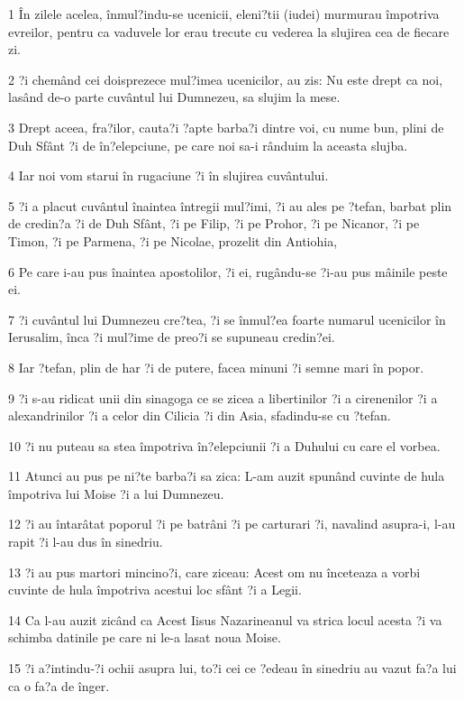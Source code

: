 \par 1 În zilele acelea, înmul?indu-se ucenicii, eleni?tii (iudei) murmurau împotriva evreilor, pentru ca vaduvele lor erau trecute cu vederea la slujirea cea de fiecare zi.
\par 2 ?i chemând cei doisprezece mul?imea ucenicilor, au zis: Nu este drept ca noi, lasând de-o parte cuvântul lui Dumnezeu, sa slujim la mese.
\par 3 Drept aceea, fra?ilor, cauta?i ?apte barba?i dintre voi, cu nume bun, plini de Duh Sfânt ?i de în?elepciune, pe care noi sa-i rânduim la aceasta slujba.
\par 4 Iar noi vom starui în rugaciune ?i în slujirea cuvântului.
\par 5 ?i a placut cuvântul înaintea întregii mul?imi, ?i au ales pe ?tefan, barbat plin de credin?a ?i de Duh Sfânt, ?i pe Filip, ?i pe Prohor, ?i pe Nicanor, ?i pe Timon, ?i pe Parmena, ?i pe Nicolae, prozelit din Antiohia,
\par 6 Pe care i-au pus înaintea apostolilor, ?i ei, rugându-se ?i-au pus mâinile peste ei.
\par 7 ?i cuvântul lui Dumnezeu cre?tea, ?i se înmul?ea foarte numarul ucenicilor în Ierusalim, înca ?i mul?ime de preo?i se supuneau credin?ei.
\par 8 Iar ?tefan, plin de har ?i de putere, facea minuni ?i semne mari în popor.
\par 9 ?i s-au ridicat unii din sinagoga ce se zicea a libertinilor ?i a cirenenilor ?i a alexandrinilor ?i a celor din Cilicia ?i din Asia, sfadindu-se cu ?tefan.
\par 10 ?i nu puteau sa stea împotriva în?elepciunii ?i a Duhului cu care el vorbea.
\par 11 Atunci au pus pe ni?te barba?i sa zica: L-am auzit spunând cuvinte de hula împotriva lui Moise ?i a lui Dumnezeu.
\par 12 ?i au întarâtat poporul ?i pe batrâni ?i pe carturari ?i, navalind asupra-i, l-au rapit ?i l-au dus în sinedriu.
\par 13 ?i au pus martori mincino?i, care ziceau: Acest om nu înceteaza a vorbi cuvinte de hula împotriva acestui loc sfânt ?i a Legii.
\par 14 Ca l-au auzit zicând ca Acest Iisus Nazarineanul va strica locul acesta ?i va schimba datinile pe care ni le-a lasat noua Moise.
\par 15 ?i a?intindu-?i ochii asupra lui, to?i cei ce ?edeau în sinedriu au vazut fa?a lui ca o fa?a de înger.

